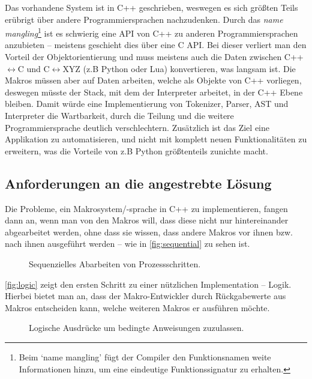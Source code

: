     Das vorhandene System ist in C++ geschrieben, weswegen es sich größten Teils erübrigt über andere Programmiersprachen nachzudenken. Durch das \emph{name mangling}\footnote{
      Beim `name mangling' fügt der Compiler den Funktionsnamen weite Informationen hinzu, um eine eindeutige Funktionssignatur zu erhalten.
    } ist es schwierig eine API von C++ zu anderen Programmiersprachen anzubieten -- meistens geschieht dies über eine C API. Bei dieser verliert man den Vorteil der Objektorientierung und muss meistens auch die Daten zwischen C++$\longleftrightarrow$C und C$\longleftrightarrow$XYZ (z.B Python oder Lua) konvertieren, was langsam ist. Die Makros müssen aber auf Daten arbeiten, welche als Objekte von C++ vorliegen, deswegen müsste der Stack, mit dem der Interpreter arbeitet, in der C++ Ebene bleiben. Damit würde eine Implementierung von Tokenizer, Parser, AST und Interpreter die Wartbarkeit, durch die Teilung und die weitere Programmiersprache deutlich verschlechtern. Zusätzlich ist das Ziel eine Applikation zu automatisieren, und nicht mit komplett neuen Funktionalitäten zu erweitern, was die Vorteile von z.B Python größtenteils zunichte macht.

  \subsection{Anforderungen an die angestrebte Lösung}
  \label{ssec:Anforderungen an die angestrebte Lösung}
    Die Probleme, ein Makrosystem/-sprache in C++ zu implementieren, fangen dann an, wenn man von den Makros will, dass diese nicht nur hintereinander abgearbeitet werden, ohne dass sie wissen, dass andere Makros vor ihnen bzw. nach ihnen ausgeführt werden -- wie in \autoref{fig:sequential} zu sehen ist.

    \begin{figure}[H]
      \centering
      \caption{Sequenzielles Abarbeiten von Prozessschritten.}
      \label{fig:sequential}
    \end{figure}

    \autoref{fig:logic} zeigt den ersten Schritt zu einer nützlichen Implementation -- Logik. Hierbei bietet man an, dass der Makro-Entwickler durch Rückgabewerte aus Makros entscheiden kann, welche weiteren Makros er ausführen möchte.

    \begin{figure}[H]
      \centering
      \caption{Logische Ausdrücke um bedingte Anweisungen zuzulassen.}
      \label{fig:logic}
    \end{figure}

